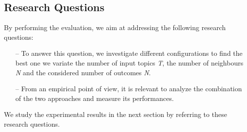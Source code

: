 %
%
%



\subsection{Research Questions} \label{sec:ResearchQuestions}
By performing the evaluation, we aim at addressing the following research questions:
\begin{itemize}
	\item[--] \rqfirst To answer this question, we investigate different configurations to find the best one \ie we variate the number of input topics \emph{T}, the number of neighbours \emph{N} and the considered number of outcomes \emph{N}.
	
	\item[--] \rqsecond From an empirical point of view, it is relevant to analyze the combination of the two approaches and measure its performances.
\end{itemize}


We study the experimental results in the next section by referring to these research questions.
